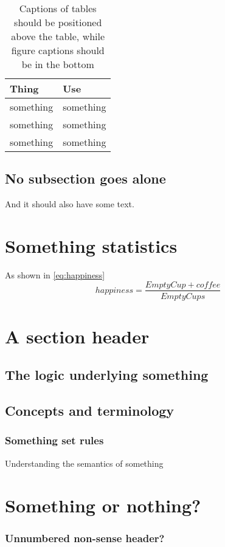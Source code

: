 		
\begin{table}[hb] %
	\centering
	\caption{Captions of tables should be positioned above the table, while figure captions should be in the bottom}
	\begin{tabular}{ll}
		\hline
		\textbf{Thing} & \textbf{Use} \\
		\hline
		something & something \\
		something & something \\
		something & something \\
		\hline
	\end{tabular}
	\label{tab:typesomething}
\end{table}
		
\subsection{No subsection goes alone}
\label{subsec:somenoth}

And it should also have some text.


\section{Something statistics}
\label{sec:somestatistics}
	
As shown in \autoref{eq:happiness}
\begin{equation}\label{eq:happiness}
	happiness=\frac{EmptyCup+coffee}{EmptyCups}
\end{equation}	
	
\section{A section header}
\label{sec:some-ref}
	
\subsection{The logic underlying something}
\label{subsec:logicunderlying}
    	
    	
\subsection{Concepts and terminology}
\label{subsec:conceptsterm}	
		
\subsubsection*{Something set rules} 

Understanding the semantics of something

\section{Something or nothing?}
\label{sec:someornot}

\subsubsection*{Unnumbered non-sense header?}

   	
    	
    